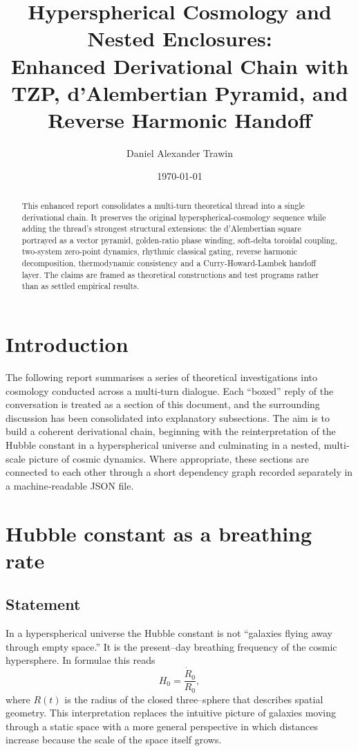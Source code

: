\documentclass[12pt,a4paper]{article}
\title{Hyperspherical Cosmology and Nested Enclosures:\\Enhanced Derivational Chain with TZP, d'Alembertian Pyramid, and Reverse Harmonic Handoff}
\author{Daniel Alexander Trawin}
\date{\today}
\begin{document}
\maketitle

\begin{abstract}
This enhanced report consolidates a multi-turn theoretical thread into a single derivational chain.  It preserves the original hyperspherical-cosmology sequence while adding the thread's strongest structural extensions: the d'Alembertian square portrayed as a vector pyramid, golden-ratio phase winding, soft-delta toroidal coupling, two-system zero-point dynamics, rhythmic classical gating, reverse harmonic decomposition, thermodynamic consistency and a Curry-Howard-Lambek handoff layer.  The claims are framed as theoretical constructions and test programs rather than as settled empirical results.
\end{abstract}

\section{Introduction}
The following report summarises a series of theoretical investigations into cosmology conducted across a multi‐turn dialogue.  Each ``boxed'' reply of the conversation is treated as a section of this document, and the surrounding discussion has been consolidated into explanatory subsections.  The aim is to build a coherent derivational chain, beginning with the reinterpretation of the Hubble constant in a hyperspherical universe and culminating in a nested, multi‐scale picture of cosmic dynamics.  Where appropriate, these sections are connected to each other through a short dependency graph recorded separately in a machine‐readable JSON file.

\section{Hubble constant as a breathing rate}
\label{sec:breathing}
\subsection{Statement}
In a hyperspherical universe the Hubble constant is not ``galaxies flying away through empty space.''  It is the present–day breathing frequency of the cosmic hypersphere.  In formulae this reads
\[
H_0 = \frac{\dot{R}_0}{R_0},
\]
where $R(t)$ is the radius of the closed three–sphere that describes spatial geometry.  This interpretation replaces the intuitive picture of galaxies moving through a static space with a more general perspective in which distances increase because the scale of the space itself grows.
\end{document}
